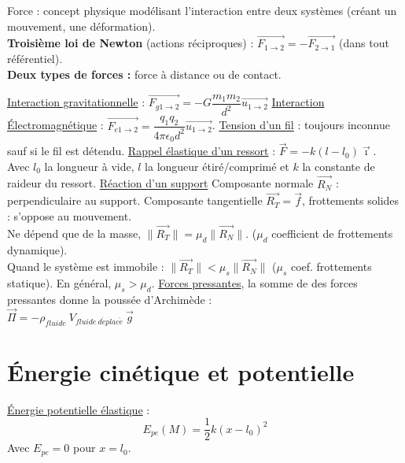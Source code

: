 \documentclass[13pt, twoside, a4paper, french]{report}
\begin{document}
            Force : concept physique modélisant l'interaction entre deux systèmes (créant un mouvement, une déformation).\\

            \textbf{Troisième loi de Newton} (actions réciproques) : $\overrightarrow{F_{1\rightarrow2}} = - \overrightarrow{F_{2\rightarrow1}}$ (dans tout référentiel).\\

            \textbf{Deux types de forces :} force à distance ou de contact.
            \begin{outline}
                \1 \underline{Interaction gravitationnelle} : $\overrightarrow{F_{g1\rightarrow2}} = - G\dfrac{m_1 m_2}{d^2}\overrightarrow{u_{1\rightarrow2}}$
                \1 \underline{Interaction Électromagnétique} : $\overrightarrow{F_{e1\rightarrow2}} = \dfrac{q_1 q_2}{4\pi\epsilon_0 d^2}\overrightarrow{u_{1\rightarrow2}}$.
                \1 \underline{Tension d'un fil} : toujours inconnue sauf si le fil est détendu.
                \1 \underline{Rappel élastique d'un ressort} : $\vec{F} = - k (l - l_0)\vec{\imath}$.\\Avec $l_0$ la longueur à vide, $l$ la longueur étiré/comprimé et $k$ la constante de raideur du ressort.
                \1 \underline{Réaction d'un support}
                \2 Composante normale $\overrightarrow{R_N}$ : perpendiculaire au support.
                \2 Composante tangentielle $\overrightarrow{R_T} = \overrightarrow{f}$, frottements solides : s'oppose au mouvement.\\Ne dépend que de la masse, $\|\overrightarrow{R_T}\| = \mu_d \|\overrightarrow{R_N}\|$. ($\mu_d$ coefficient de frottements dynamique).\\Quand le système est immobile : $\|\overrightarrow{R_T}\| < \mu_s \|\overrightarrow{R_N}\|$ ($\mu_s$ coef. frottements statique). En général, $\mu_s > \mu_d$.
                \1 \underline{Forces pressantes}, la somme de des forces pressantes donne la poussée d'Archimède :
                \\$\overrightarrow{\Pi} = - \rho_{fluide}\ V_{fluide \ d\acute eplac\acute e}\ \vec{g}$
            \end{outline}


    \section{Énergie cinétique et potentielle}\label{sec:energie-cinetique-et-potentielle}

        \underline{Énergie potentielle élastique} : \[\displaystyle E_{pe}(M) = \dfrac{1}{2} k (x - l_0)^2\]
        Avec $E_{pe} = 0$ pour $x = l_0$.
\end{document}
